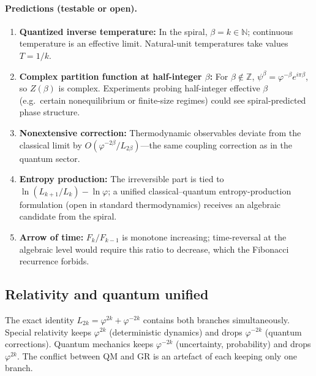 \documentclass[12pt,a4paper]{article}
\begin{document}
\paragraph{Predictions (testable or open).}
\begin{enumerate}[nosep]
\item \textbf{Quantized inverse temperature:} In the spiral, $\beta = k \in \mathbb{N}$; continuous temperature is an effective limit. Natural-unit temperatures take values $T = 1/k$.
\item \textbf{Complex partition function at half-integer $\beta$:} For $\beta \notin \mathbb{Z}$, $\psi^\beta = \varphi^{-\beta} e^{i\pi\beta}$, so $Z(\beta)$ is complex. Experiments probing half-integer effective $\beta$ (e.g.\ certain nonequilibrium or finite-size regimes) could see spiral-predicted phase structure.
\item \textbf{Nonextensive correction:} Thermodynamic observables deviate from the classical limit by $O(\varphi^{-2\beta}/L_{2\beta})$---the same coupling correction as in the quantum sector.
\item \textbf{Entropy production:} The irreversible part is tied to $\ln(L_{k+1}/L_k) - \ln\varphi$; a unified classical--quantum entropy-production formulation (open in standard thermodynamics) receives an algebraic candidate from the spiral.
\item \textbf{Arrow of time:} $F_k/F_{k-1}$ is monotone increasing; time-reversal at the algebraic level would require this ratio to decrease, which the Fibonacci recurrence forbids.
\end{enumerate}

\subsection{Relativity and quantum unified}

The exact identity $L_{2k} = \varphi^{2k} + \varphi^{-2k}$ contains both branches simultaneously. Special relativity keeps $\varphi^{2k}$ (deterministic dynamics) and drops $\varphi^{-2k}$ (quantum corrections). Quantum mechanics keeps $\varphi^{-2k}$ (uncertainty, probability) and drops $\varphi^{2k}$.  The conflict between QM and GR is an artefact of each keeping only one branch.




\end{document}
